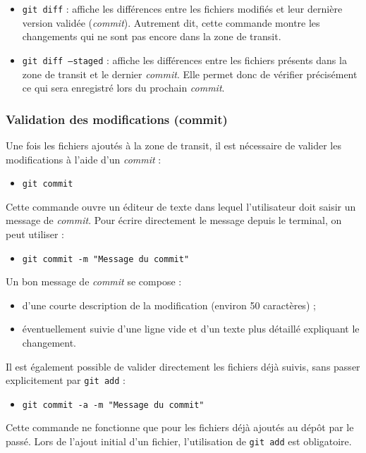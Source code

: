 \documentclass{article}
\begin{document}
\begin{itemize}
    \item \texttt{git diff} : affiche les différences entre les fichiers modifiés et leur dernière version validée (\emph{commit}).  
    Autrement dit, cette commande montre les changements qui ne sont pas encore dans la zone de transit.
    \item \texttt{git diff --staged} : affiche les différences entre les fichiers présents dans la zone de transit et le dernier \emph{commit}.  
    Elle permet donc de vérifier précisément ce qui sera enregistré lors du prochain \emph{commit}.
\end{itemize}

\subsubsection{Validation des modifications (commit)}
Une fois les fichiers ajoutés à la zone de transit, il est nécessaire de valider les modifications à l’aide d’un \emph{commit} :
\begin{itemize}
    \item \texttt{git commit}
\end{itemize}
Cette commande ouvre un éditeur de texte dans lequel l’utilisateur doit saisir un message de \emph{commit}.  
Pour écrire directement le message depuis le terminal, on peut utiliser :

\begin{itemize}
    \item \texttt{git commit -m "Message du commit"}
\end{itemize}
Un bon message de \emph{commit} se compose :
\begin{itemize}
    \item d’une courte description de la modification (environ 50 caractères) ;
    \item éventuellement suivie d’une ligne vide et d’un texte plus détaillé expliquant le changement.
\end{itemize}
Il est également possible de valider directement les fichiers déjà suivis, sans passer explicitement par \texttt{git add} :

\begin{itemize}
    \item \texttt{git commit -a -m "Message du commit"}
\end{itemize}
Cette commande ne fonctionne que pour les fichiers déjà ajoutés au dépôt par le passé. Lors de l’ajout initial d’un fichier, l’utilisation de \texttt{git add} est obligatoire.
\end{document}

